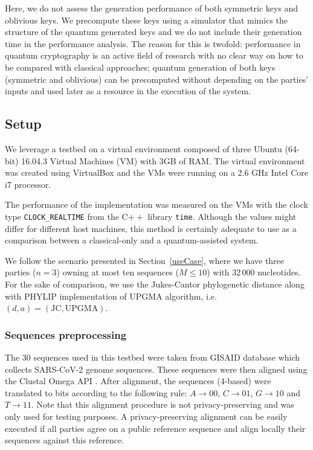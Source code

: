 Here, we do not assess the generation performance of both symmetric keys and oblivious keys. We precompute these keys using a simulator that mimics the structure of the quantum generated keys and we do not include their generation time in the performance analysis. The reason for this is twofold: performance in quantum cryptography is an active field of research with no clear way on how to be compared with classical approaches; quantum generation of both keys (symmetric and oblivious) can be precomputed without depending on the parties' inputs and used later as a resource in the execution of the system.

\subsection{Setup}

We leverage a testbed on a virtual environment composed of three Ubuntu (64-bit) 16.04.3 Virtual Machines (VM) with 3GB of RAM. The virtual environment was created using VirtualBox and the VMs were running on a 2.6 GHz Intel Core i7 processor.

The performance of the implementation was measured on the VMs with the clock type \texttt{CLOCK\_REALTIME} from the C$++$ library \texttt{time}. Although the values might differ for different host machines, this method is certainly adequate to use as a comparison between a classical-only and a quantum-assisted system.

We follow the scenario presented in Section~\ref{useCase}, where we have three parties ($n=3$) owning at most ten sequences ($M\leq10$) with $32\,000$ nucleotides. For the sake of comparison, we use the Jukes-Cantor phylogenetic distance along with PHYLIP implementation of UPGMA algorithm, i.e. $(d, a) = (\text{JC}, \text{UPGMA})$.

\subsubsection{Sequences preprocessing}

The $30$ sequences used in this testbed were taken from GISAID database \cite{GISAID} which collects SARS-CoV-2 genome sequences. These sequences were then aligned using the Clustal Omega API \cite{MPL19}. After alignment, the sequences (4-based) were translated to bits according to the following rule: $A \rightarrow 00$, $C \rightarrow 01$, $G \rightarrow 10$ and $T \rightarrow 11$. Note that this alignment procedure is not privacy-preserving and was only used for testing purposes. A privacy-preserving alignment can be easily executed if all parties agree on a public reference sequence and align locally their sequences against this reference.


